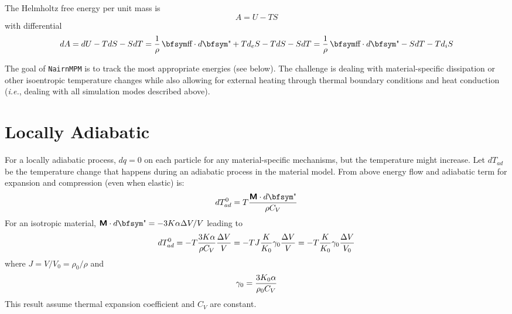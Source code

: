 \documentclass[11pt]{book}
\newcommand{\tens}[1]{\boldsymbol{\mathsf{#1}}}
\def\st{{\hbox{\bfsym\char'033}}}
\def\et{{\hbox{\bfsym\char'042}}}
\begin{document}
The Helmholtz free energy per unit mass is
\begin{equation}%
     A = U - TS
\end{equation}%
with differential
\begin{equation}%
    dA = dU - TdS - SdT = {1\over \rho}\thinspace \st\cdot d\et + T d_eS - TdS - SdT
              = {1\over \rho}\thinspace \st\cdot d\et  - SdT - T d_iS
\end{equation}%

The goal of {\tt NairnMPM} is to track the most appropriate energies (see below). The challenge is dealing with material-specific dissipation or other isoentropic temperature changes while also allowing for external heating through thermal boundary conditions and heat conduction ({\em i.e.}, dealing with all simulation modes described above).

\section{Locally Adiabatic}

For a locally adiabatic process, $dq=0$ on each particle for any material-specific mechanisms, but the temperature might increase. Let $dT_{ad}$ be the temperature change that happens during an adiabatic process in the material model. From above energy flow and adiabatic term for expansion and compression (even when elastic) is:
\begin{equation}
    dT_{ad}^0 = T {\tens{M}\cdot d\et\over \rho C_V}
\end{equation}
For an isotropic material, $\tens{M}\cdot d\et = - 3K\alpha \Delta V/V$ leading to
\begin{equation}
    dT_{ad}^0 = -T {3K\alpha\over \rho C_V}{\Delta V\over V} = -T J {K\over K_0} \gamma_0 {\Delta V\over V} = -T {K\over K_0} \gamma_0 {\Delta V\over V_0}
\end{equation}
where $J = V/V_0 = \rho_0/ \rho$ and
\begin{equation}
    \gamma_0 = {3K_0\alpha\over \rho_0 C_V}      \label{gamzdef}
\end{equation}
This result assume thermal expansion coefficient and $C_V$ are constant.
\end{document}
